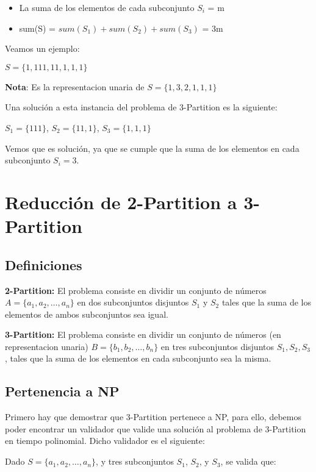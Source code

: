 \begin{itemize}
    \item La suma de los elementos de cada subconjunto \(S_i\) = m
    \item sum(S) = \(sum(S_1) + sum(S_2) + sum(S_3)\) = 3m
\end{itemize}

Veamos un ejemplo: 

$S = \{1, 111, 11, 1, 1, 1\}$

\textbf{Nota}: Es la representacion unaria de $S = \{1, 3, 2, 1, 1, 1\}$

Una solución a esta instancia del problema de 3-Partition es la siguiente:

$S_1 = \{111\}$, $S_2 = \{11, 1\}$, $S_3 = \{1, 1, 1\}$

Vemos que es solución, ya que se cumple que la suma de los elementos en cada subconjunto $S_i = 3$. %

\section*{Reducción de 2-Partition a 3-Partition}

\subsection*{Definiciones}

\textbf{2-Partition:} El problema consiste en dividir un conjunto de números \( A = \{a_1, a_2, \dots, a_n\} \) en dos subconjuntos disjuntos \( S_1 \) y \( S_2 \) tales que la suma de los elementos de ambos subconjuntos sea igual.

\textbf{3-Partition:} El problema consiste en dividir un conjunto de números (en representacion unaria) \( B = \{b_1, b_2, \dots, b_n\} \) en tres subconjuntos disjuntos \( S_1, S_2, S_3 \), tales que la suma de los elementos en cada subconjunto sea la misma.

\subsection*{Pertenencia a NP}

Primero hay que demostrar que 3-Partition pertenece a NP, para ello, debemos poder encontrar un validador que valide una solución al problema de 3-Partition en tiempo polinomial. Dicho validador es el siguiente:

Dado \( S = \{a_1, a_2, \dots, a_n\} \), y tres subconjuntos $S_1$, $S_2$, y $S_3$, se valida que:

